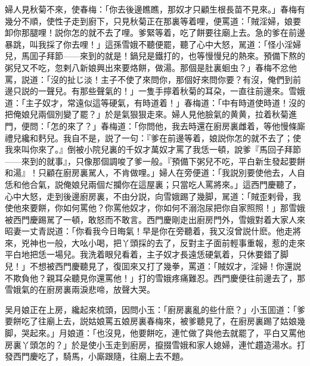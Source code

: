 婦人見秋菊不來，使春梅：「你去後邊瞧瞧，那奴才只顧生根長苗不見來。」春梅有幾分不順，使性子走到廚下，只見秋菊正在那裏等着哩，便罵道：「賊淫婦，娘要卸你那腿哩！説你怎的就不去了哩。爹緊等着，吃了餅要往廟上去。急的爹在前邊暴跳，叫我採了你去哩！」這孫雪娥不聽便罷，聽了心中大怒，駡道：「怪小淫婦兒，馬囬子拜節——來到的就是！鍋兒是鐵打的，也等慢慢兒的熱來。預備下熬的粥兒又不吃，忽剌八新娘興出來要烙餅，做湯。那個是肚裏蛔虫？」春梅不忿他罵，説道：「沒的扯じ淡！主子不使了來問你，那個好來問你要？有沒，俺們到前邊只説的一聲兒。有那些聲氣的！」一隻手擰着秋菊的耳朶，一直往前邊來。雪娥道：「主子奴才，常遠似這等硬氣，有時道着！」春梅道：「中有時道使時道！沒的把俺娘兒兩個別變了罷？」於是氣狠狠走來。婦人見他臉氣的黄黄，拉着秋菊進門，便問：「怎的來了？」春梅道：「你問他，我去時還在廚房裏雌着，等他慢條廝禮兒纔和麫兒。我自不是，説了一句：『爹在前邊等着，娘説你怎的就不去了；使我來叫你來了。』倒被小院兒裏的千奴才萬奴才罵了我恁一頓，說爹『馬回子拜節——來到的就事』，只像那個調唆了爹一般。『預備下粥兒不吃，平白新生發起要餅和湯』！只顧在廚房裏駡人，不肯做哩。」婦人在旁便道：「我説別要使他去，人自恁和他合氣，説俺娘兒兩個だ攔你在這屋裏；只當吃人罵將來。」這西門慶聽了，心中大怒，走到後邊廚房裏，不由分説，向雪娥踢了幾脚，駡道：「賊歪剌骨，我使他來要餅，你如何罵他？你罵他奴才，你如何不溺泡尿把你自家照照！」那雪娥被西門慶踢駡了一頓，敢怒而不敢言。西門慶剛走出廚房門外，雪娥對着大家人來昭妻一丈青説道：「你看我今日晦氣！早是你在旁聽着，我又沒曾説什麽。他走將來，兇神也一般，大吆小喝，把丫頭採的去了，反對主子面前輕事重報，惹的走來平白地把恁一場兒。我洗着眼兒看着，主子奴才長遠恁硬氣着，只休要錯了脚兒！」不想被西門慶聽見了，復囬來又打了幾拳，罵道：「賊奴才，淫婦！你還説不欺負他？親耳朵聽見你還罵他！」打的雪娥疼痛難忍。西門慶便往前邊去了，那雪娥氣的在廚房裏兩淚悲啼，放聲大哭。

吴月娘正在上房，纔起來梳頭，因問小玉：「廚房裏亂的些什麽？」小玉囬道：「爹要餅吃了往廟上去，説姑娘罵五娘房裏春梅來，被爹聽見了，在廚房裏踢了姑娘幾脚，哭起來。」月娘道：「也沒見，他要餅吃，連忙做了與他去就罷了，平白又罵他房裏丫頭怎的？」於是使小玉走到廚房，攛掇雪娥和家人媳婦，連忙趲造湯水。打發西門慶吃了，騎馬，小廝跟隨，往廟上去不題。

